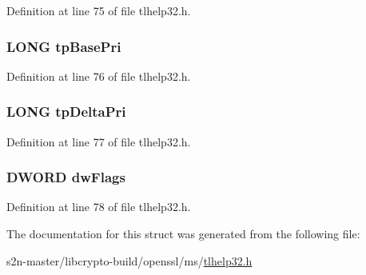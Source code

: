 Definition at line 75 of file tlhelp32.\+h.

\subsubsection[{\texorpdfstring{tp\+Base\+Pri}{tpBasePri}}]{\setlength{\rightskip}{0pt plus 5cm}L\+O\+NG tp\+Base\+Pri}\hypertarget{structtag_t_h_r_e_a_d_e_n_t_r_y32_ae1ec2b748649c85fa6e2ca7594e64e85}{}\label{structtag_t_h_r_e_a_d_e_n_t_r_y32_ae1ec2b748649c85fa6e2ca7594e64e85}


Definition at line 76 of file tlhelp32.\+h.

\subsubsection[{\texorpdfstring{tp\+Delta\+Pri}{tpDeltaPri}}]{\setlength{\rightskip}{0pt plus 5cm}L\+O\+NG tp\+Delta\+Pri}\hypertarget{structtag_t_h_r_e_a_d_e_n_t_r_y32_aed2c16d027dc0819aca2dad4d61deae8}{}\label{structtag_t_h_r_e_a_d_e_n_t_r_y32_aed2c16d027dc0819aca2dad4d61deae8}


Definition at line 77 of file tlhelp32.\+h.

\subsubsection[{\texorpdfstring{dw\+Flags}{dwFlags}}]{\setlength{\rightskip}{0pt plus 5cm}D\+W\+O\+RD dw\+Flags}\hypertarget{structtag_t_h_r_e_a_d_e_n_t_r_y32_a4d2f405b1141000eb2af256e0fc8b98b}{}\label{structtag_t_h_r_e_a_d_e_n_t_r_y32_a4d2f405b1141000eb2af256e0fc8b98b}


Definition at line 78 of file tlhelp32.\+h.



The documentation for this struct was generated from the following file\+:\begin{DoxyCompactItemize}
\item 
s2n-\/master/libcrypto-\/build/openssl/ms/\hyperlink{tlhelp32_8h}{tlhelp32.\+h}\end{DoxyCompactItemize}
